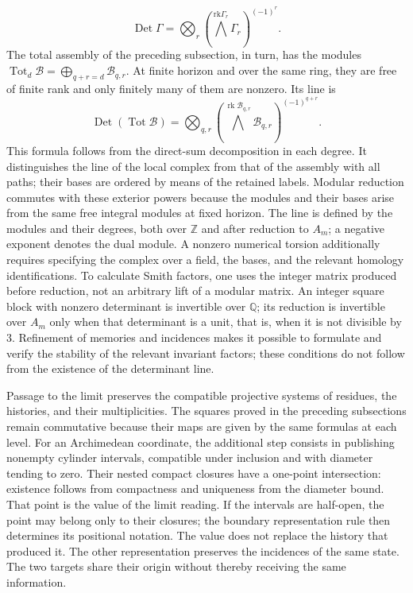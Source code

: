 \[
\operatorname{Det}\Gamma=
\bigotimes_r\left(\bigwedge^{\mathrm{rk}\Gamma_r}\Gamma_r\right)^{(-1)^r}.
\]
The total assembly of the preceding subsection, in turn, has the modules \(\operatorname{Tot}_d\mathcal B=\bigoplus_{q+r=d}\mathcal B_{q,r}\). At finite horizon and over the same ring, they are free of finite rank and only finitely many of them are nonzero. Its line is
\[
\operatorname{Det}(\operatorname{Tot}\mathcal B)=
\bigotimes_{q,r}
\left(\bigwedge^{\operatorname{rk}\mathcal B_{q,r}}
\mathcal B_{q,r}\right)^{(-1)^{q+r}}.
\]
This formula follows from the direct-sum decomposition in each degree. It distinguishes the line of the local complex from that of the assembly with all paths; their bases are ordered by means of the retained labels. Modular reduction commutes with these exterior powers because the modules and their bases arise from the same free integral modules at fixed horizon.
The line is defined by the modules and their degrees, both over \(\mathbb Z\) and after reduction to \(A_m\); a negative exponent denotes the dual module. A nonzero numerical torsion additionally requires specifying the complex over a field, the bases, and the relevant homology identifications. To calculate Smith factors, one uses the integer matrix produced before reduction, not an arbitrary lift of a modular matrix. An integer square block with nonzero determinant is invertible over \(\mathbb Q\); its reduction is invertible over \(A_m\) only when that determinant is a unit, that is, when it is not divisible by \(3\). Refinement of memories and incidences makes it possible to formulate and verify the stability of the relevant invariant factors; these conditions do not follow from the existence of the determinant line.

Passage to the limit preserves the compatible projective systems of residues, the histories, and their multiplicities. The squares proved in the preceding subsections remain commutative because their maps are given by the same formulas at each level. For an Archimedean coordinate, the additional step consists in publishing nonempty cylinder intervals, compatible under inclusion and with diameter tending to zero. Their nested compact closures have a one-point intersection: existence follows from compactness and uniqueness from the diameter bound. That point is the value of the limit reading. If the intervals are half-open, the point may belong only to their closures; the boundary representation rule then determines its positional notation. The value does not replace the history that produced it. The other representation preserves the incidences of the same state. The two targets share their origin without thereby receiving the same information.

